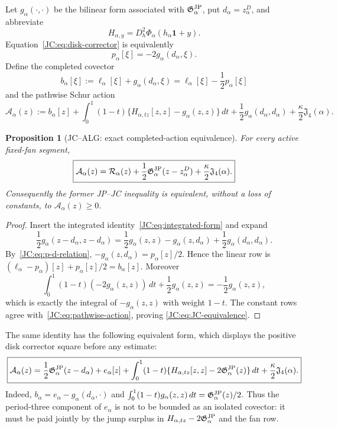 \documentclass[11pt]{amsart}
\providecommand{\mathscr}{\mathcal}
\numberwithin{equation}{section}
\newtheorem{proposition}[theorem]{Proposition}
\theoremstyle{definition}
\theoremstyle{remark}
\newcommand{\Jfour}{\mathfrak J_4}
\newcommand{\Gjp}{\mathfrak G^{\rm JP}}
\providecommand{\mathscr}[1]{\mathcal{#1}}
\begin{document}
Let $g_\alpha(\cdot,\cdot)$ be the bilinear form associated with
$\Gjp_\alpha$, put $d_\alpha=z_\alpha^D$, and abbreviate
\begin{equation}\label{JC:eq:Hessian-family}
 H_{\alpha,y}=D_h^2\Phi_\alpha(h_\alpha\mathbf1+y).
\end{equation}
Equation~\eqref{JC:eq:disk-corrector} is equivalently
\begin{equation}\label{JC:eq:p-d-relation}
 p_\alpha[\xi]=-2g_\alpha(d_\alpha,\xi).
\end{equation}
Define the completed covector
\begin{equation}\label{JC:eq:completed-covector}
 b_\alpha[\xi]
 :=\ell_\alpha[\xi]+g_\alpha(d_\alpha,\xi)
 =\ell_\alpha[\xi]-\frac12p_\alpha[\xi]
\end{equation}
and the pathwise Schur action
\begin{equation}\label{JC:eq:pathwise-action}
 \mathscr A_\alpha(z):=
 b_\alpha[z]
 +\int_0^1(1-t)
 \{H_{\alpha,tz}[z,z]-g_\alpha(z,z)\}\,dt
 +\frac12g_\alpha(d_\alpha,d_\alpha)
 +\frac\kappa2\Jfour(\alpha).
\end{equation}

\begin{proposition}[JC--ALG: exact completed-action equivalence]
\label{JC:prop:JC-ALG}
For every active fixed-fan segment,
\begin{equation}\label{JC:eq:JC-equivalence}
 \boxed{
 \mathscr A_\alpha(z)
 =\mathscr R_\alpha(z)
  +\frac12\Gjp_\alpha(z-z_\alpha^D)
  +\frac\kappa2\Jfour(\alpha).}
\end{equation}
Consequently the former JP--JC inequality is equivalent, without a loss
of constants, to $\mathscr A_\alpha(z)\ge0$.
\end{proposition}

\begin{proof}
Insert the integrated identity~\eqref{JC:eq:integrated-form} and expand
\[
 \frac12g_\alpha(z-d_\alpha,z-d_\alpha)
 =\frac12g_\alpha(z,z)-g_\alpha(z,d_\alpha)
   +\frac12g_\alpha(d_\alpha,d_\alpha).
\]
By~\eqref{JC:eq:p-d-relation},
$-g_\alpha(z,d_\alpha)=p_\alpha[z]/2$.  Hence the linear row is
$(\ell_\alpha-p_\alpha)[z]+p_\alpha[z]/2=b_\alpha[z]$.
Moreover
\[
 \int_0^1(1-t)(-2g_\alpha(z,z))\,dt
 +\frac12g_\alpha(z,z)=-\frac12g_\alpha(z,z),
\]
which is exactly the integral of $-g_\alpha(z,z)$ with weight $1-t$.
The constant rows agree with~\eqref{JC:eq:pathwise-action}, proving
\eqref{JC:eq:JC-equivalence}.
\end{proof}

The same identity has the following equivalent form, which displays the
positive disk corrector square before any estimate:
\begin{equation}\label{JC:eq:joint-Peano-block}
 \boxed{
 \mathscr A_\alpha(z)
 =\frac12\Gjp_\alpha(z-d_\alpha)
  +e_\alpha[z]
  +\int_0^1(1-t)
    \{H_{\alpha,tz}[z,z]-2\Gjp_\alpha(z)\}\,dt
  +\frac\kappa2\Jfour(\alpha).}
\end{equation}
Indeed, $b_\alpha=e_\alpha-g_\alpha(d_\alpha,\cdot)$ and
$\int_0^1(1-t)g_\alpha(z,z)\,dt=\Gjp_\alpha(z)/2$.
Thus the period-three component of $e_\alpha$ is not to be bounded as an
isolated covector: it must be paid jointly by the jump surplus in
$H_{\alpha,tz}-2\Gjp_\alpha$ and the fan row.
\end{document}
